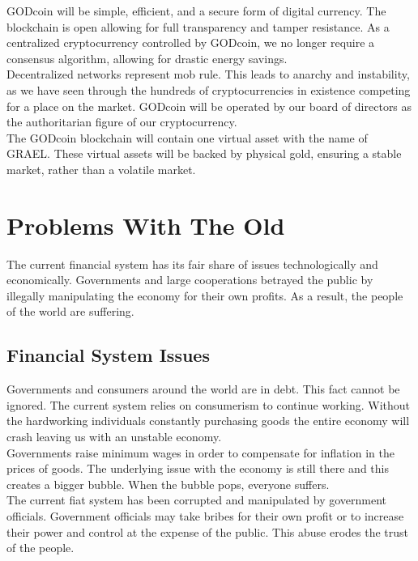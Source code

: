 \documentclass[12pt,a4paper]{article}
\begin{document}
  GODcoin will be simple, efficient, and a secure form of digital currency. The
  blockchain is open allowing for full transparency and tamper resistance. As a
  centralized cryptocurrency controlled by GODcoin, we no longer require a
  consensus algorithm, allowing for drastic energy savings.\\

  Decentralized networks represent mob rule. This leads to anarchy and
  instability, as we have seen through the hundreds of cryptocurrencies in
  existence competing for a place on the market. GODcoin will be operated by our
  board of directors as the authoritarian figure of our cryptocurrency.\\

  The GODcoin blockchain will contain one virtual asset with the name of GRAEL.
  These virtual assets will be backed by physical gold, ensuring a stable
  market, rather than a volatile market.

  \section{Problems With The Old}
  The current financial system has its fair share of issues technologically and
  economically. Governments and large cooperations betrayed the public by
  illegally manipulating the economy for their own profits. As a result, the
  people of the world are suffering.

  \subsection{Financial System Issues}
  Governments and consumers around the world are in debt. This fact cannot be
  ignored. The current system relies on consumerism to continue working. Without
  the hardworking individuals constantly purchasing goods the entire economy
  will crash leaving us with an unstable economy.\\

  Governments raise minimum wages in order to compensate for inflation in the
  prices of goods. The underlying issue with the economy is still there and this
  creates a bigger bubble. When the bubble pops, everyone suffers.\\

  The current fiat system has been corrupted and manipulated by government
  officials. Government officials may take bribes for their own profit or to
  increase their power and control at the expense of the public. This abuse
  erodes the trust of the people.\\
\end{document}

